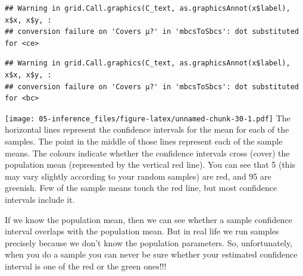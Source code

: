 \documentclass[
]{book}
\begin{document}
\begin{verbatim}
## Warning in grid.Call.graphics(C_text, as.graphicsAnnot(x$label), x$x, x$y, :
## conversion failure on 'Covers μ?' in 'mbcsToSbcs': dot substituted for <ce>
\end{verbatim}

\begin{verbatim}
## Warning in grid.Call.graphics(C_text, as.graphicsAnnot(x$label), x$x, x$y, :
## conversion failure on 'Covers μ?' in 'mbcsToSbcs': dot substituted for <bc>
\end{verbatim}

\texttt{[image: 05-inference\_files/figure-latex/unnamed-chunk-30-1.pdf]}
The horizontal lines represent the confidence intervals for the mean for each of the samples. The point in the middle of those lines represent each of the sample means. The colours indicate whether the confidence intervals cross (cover) the population mean (represented by the vertical red line). You can see that 5 (this may vary slightly according to your random samples) are red, and 95 are greenish. Few of the sample means touch the red line, but most confidence intervals include it.

If we know the population mean, then we can see whether a sample confidence interval overlaps with the population mean. But in real life we run samples precisely because we don't know the population parameters. So, unfortunately, when you do a sample you can never be sure whether your estimated confidence interval is one of the red or the green ones!!!
\end{document}
